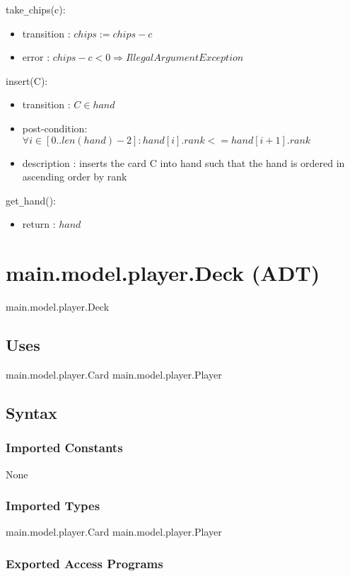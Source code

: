 \documentclass[12pt, titlepage]{article}
\begin{document}
\noindent take\verb|_|chips(c):
\begin{itemize}
\item transition : $chips := chips - c$
\item error : $chips - c < 0 \Longrightarrow IllegalArgumentException$
\end{itemize}

\noindent insert(C):
\begin{itemize}
\item transition : $C \in hand$
\item post-condition: $\forall i \in [0..len(hand) - 2] : hand[i].rank <= hand[i+1].rank$ 
\item description : inserts the card C into hand such that the hand is ordered in ascending order by rank
\end{itemize}

\noindent get\verb|_|hand():
\begin{itemize}
\item return : $hand$ 
\end{itemize}

\section* {main.model.player.Deck (ADT)}

main.model.player.Deck

\subsection* {Uses}

main.model.player.Card
main.model.player.Player

\subsection* {Syntax}

\subsubsection* {Imported Constants}

None

\subsubsection* {Imported Types}

main.model.player.Card
main.model.player.Player

\subsubsection* {Exported Access Programs}
\end{document}
